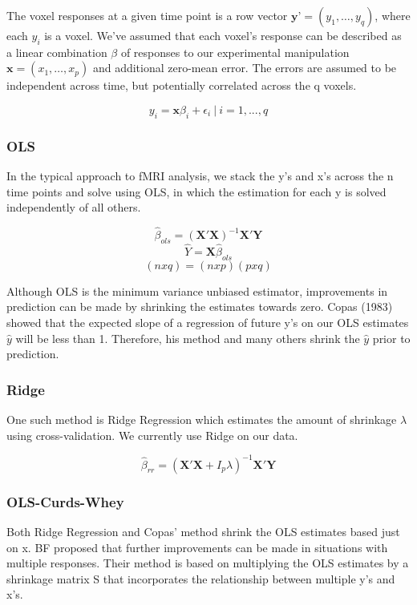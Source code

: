 \documentclass{article}
\begin{document}
The voxel responses at a given time point is a row vector $ \textbf{y'}
= (y_1, \dots ,y_q) $, where each $y_i$ is a voxel. We've assumed that each voxel's response can
be described as a linear combination $ \beta $ of responses to our
experimental manipulation $ \textbf{x}=(x_1, \dots ,x_p) $ and
additional zero-mean error. The errors are assumed to be independent across time, but potentially correlated across the q voxels. 

\[ y_i = \textbf{x} \beta_i + \epsilon_i \ | \ i =1,...,q  \]  


\subsubsection{OLS}\label{ols}

In the typical approach to fMRI analysis, we stack the y's and x's
across the n time points and solve using OLS, in which the estimation
for each y is solved independently of all others.

\[ \hat \beta_{ols} =  (\textbf{X}'\textbf{X})^{-1} \textbf{X}' \textbf{Y} \]
\[ \hat Y = \textbf{X} \hat \beta_{ols} \]
$$ (nxq) = (nxp)(pxq) $$

Although OLS is the minimum variance unbiased estimator, improvements in
prediction can be made by shrinking the estimates towards zero. Copas
(1983) showed that the expected slope of a regression of future y's on
our OLS estimates $ \hat y $ will be less than 1. Therefore, his method
and many others shrink the $ \hat y $ prior to prediction.

\subsubsection{Ridge}\label{ridge}

One such method is Ridge Regression which estimates the amount of
shrinkage $ \lambda $ using cross-validation. We currently use Ridge
on our data.

\[ \hat \beta_{rr} =  (\textbf{X}'\textbf{X} + I_p \lambda )^{-1} \textbf{X}' \textbf{Y} \]

\subsubsection{OLS-Curds-Whey}\label{ols-curds-whey}

Both Ridge Regression and Copas' method shrink the OLS estimates based
just on x. BF proposed that further improvements can be made in
situations with multiple responses. Their method is based on multiplying the
OLS estimates by a shrinkage matrix S that incorporates the relationship
between multiple y's and x's.
\end{document}
